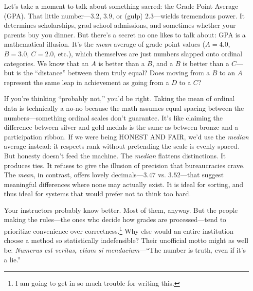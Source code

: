 \begin{mdframed}[nobreak = true, style = miscFrame, frametitle = \Large\IMFellEnglish Box 4.1: The GPA Illusion]
\IMFellEnglish

Let’s take a moment to talk about something sacred: the Grade Point Average (GPA). That little number—$3.2$, $3.9$, or (gulp) $2.3$—wields tremendous power. It determines scholarships, grad school admissions, and sometimes whether your parents buy you dinner. But there’s a secret no one likes to talk about: GPA is a mathematical illusion. It’s the \textit{mean} average of grade point values ($A = 4.0$, $B = 3.0$, $C = 2.0$, etc.), which themselves are just numbers slapped onto ordinal categories. We know that an $A$ is better than a $B$, and a $B$ is better than a $C$—but is the \enquote{distance} between them truly equal? Does moving from a $B$ to an $A$ represent the same leap in achievement as going from a $D$ to a $C$?

If you’re thinking \enquote{probably not,} you’d be right. Taking the mean of ordinal data is technically a no-no because the math assumes equal spacing between the numbers—something ordinal scales don’t guarantee. It's like claiming the difference between silver and gold medals is the same as between bronze and a participation ribbon. If we were being HONEST AND FAIR, we’d use the \textit{median} average instead: it respects rank without pretending the scale is evenly spaced. But honesty doesn’t feed the machine. The \textit{median} flattens distinctions. It produces ties. It refuses to give the illusion of precision that bureaucracies crave. The \textit{mean}, in contrast, offers lovely decimals—$3.47$ vs. $3.52$—that suggest meaningful differences where none may actually exist. It is ideal for sorting, and thus ideal for systems that would prefer not to think too hard.

Your instructors probably know better. Most of them, anyway. But the people making the rules—the ones who decide how grades are processed—tend to prioritize convenience over correctness.\footnote{I am going to get in so much trouble for writing this.} Why else would an entire institution choose a method so statistically indefensible? Their unofficial motto might as well be: \textit{Numerus est veritas, etiam si mendacium}—\enquote{The number is truth, even if it’s a lie.}
\end{mdframed}

















